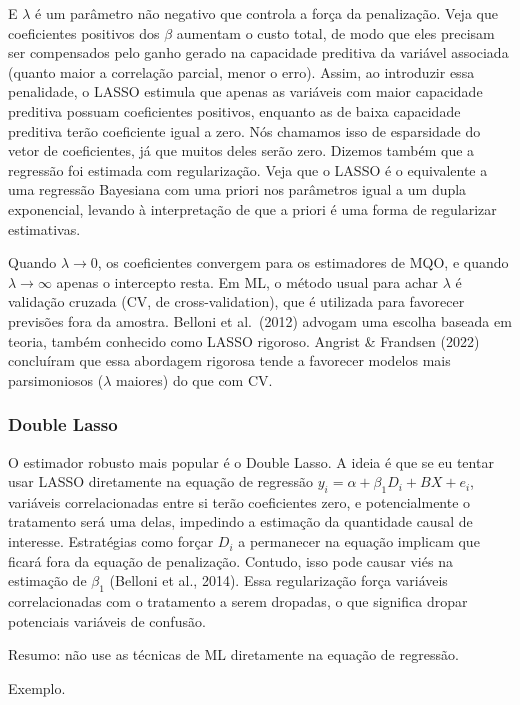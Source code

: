 \documentclass[
]{article}
\begin{document}
E \(\lambda\) é um parâmetro não negativo que controla a força da penalização. Veja que coeficientes positivos dos \(\beta\) aumentam o custo total, de modo que eles precisam ser compensados pelo ganho gerado na capacidade preditiva da variável associada (quanto maior a correlação parcial, menor o erro). Assim, ao introduzir essa penalidade, o LASSO estimula que apenas as variáveis com maior capacidade preditiva possuam coeficientes positivos, enquanto as de baixa capacidade preditiva terão coeficiente igual a zero. Nós chamamos isso de esparsidade do vetor de coeficientes, já que muitos deles serão zero. Dizemos também que a regressão foi estimada com regularização. Veja que o LASSO é o equivalente a uma regressão Bayesiana com uma priori nos parâmetros igual a um dupla exponencial, levando à interpretação de que a priori é uma forma de regularizar estimativas.

Quando \(\lambda \to 0\), os coeficientes convergem para os estimadores de MQO, e quando \(\lambda \to \infty\) apenas o intercepto resta. Em ML, o método usual para achar \(\lambda\) é validação cruzada (CV, de cross-validation), que é utilizada para favorecer previsões fora da amostra. Belloni et al.~(2012) advogam uma escolha baseada em teoria, também conhecido como LASSO rigoroso. Angrist \& Frandsen (2022) concluíram que essa abordagem rigorosa tende a favorecer modelos mais parsimoniosos (\(\lambda\) maiores) do que com CV.

\subsubsection{Double Lasso}\label{double-lasso}

O estimador robusto mais popular é o Double Lasso. A ideia é que se eu tentar usar LASSO diretamente na equação de regressão \(y_i = \alpha + \beta_1D_i + BX + e_i\), variáveis correlacionadas entre si terão coeficientes zero, e potencialmente o tratamento será uma delas, impedindo a estimação da quantidade causal de interesse. Estratégias como forçar \(D_i\) a permanecer na equação implicam que ficará fora da equação de penalização. Contudo, isso pode causar viés na estimação de \(\beta_1\) (Belloni et al., 2014). Essa regularização força variáveis correlacionadas com o tratamento a serem dropadas, o que significa dropar potenciais variáveis de confusão.

Resumo: não use as técnicas de ML diretamente na equação de regressão.

Exemplo.
\end{document}
